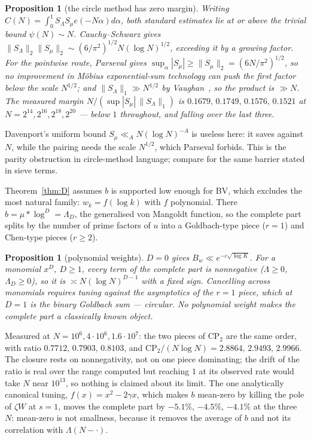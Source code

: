 \documentclass[11pt,a4paper]{article}
\theoremstyle{plain}
\newtheorem{proposition}[theorem]{Proposition}
\theoremstyle{definition}
\begin{document}
\begin{proposition}[the circle method has zero margin]\label{prop:E}
Writing $C(N)=\int_0^1 S_\Lambda S_\mu e(-N\alpha)d\alpha$, both
standard estimates lie at or above the trivial bound $\psi(N)\sim N$.
Cauchy--Schwarz gives
$\|S_\Lambda\|_2\|S_\mu\|_2 \sim (6/\pi^2)^{1/2}N(\log N)^{1/2}$,
exceeding it by a growing factor. For the pointwise route, Parseval
gives $\sup_\alpha|S_\mu| \ge \|S_\mu\|_2 = (6N/\pi^2)^{1/2}$, so no
improvement in M\"obius exponential-sum technology can push the first
factor below the scale $N^{1/2}$; and $\|S_\Lambda\|_1 \gg N^{1/2}$ by
Vaughan~\cite{Vau88}, so the product is $\gg N$.
The measured margin $N/(\sup|S_\mu|\,\|S_\Lambda\|_1)$ is
$0.1679,\,0.1749,\,0.1576,\,0.1521$ at
$N=2^{14},2^{16},2^{18},2^{20}$ --- below $1$ throughout, and falling
over the last three.
\end{proposition}

Davenport's uniform bound $S_\mu\ll_A N(\log N)^{-A}$ is useless here:
it saves against $N$, while the pairing needs the scale $N^{1/2}$,
which Parseval forbids. This is the parity obstruction in
circle-method language; compare \cite{MV17} for the same barrier stated
in sieve terms.

Theorem~\ref{thm:D} assumes $b$ is supported low enough for BV, which
excludes the most natural family: $w_k=f(\log k)$ with $f$ polynomial.
There $b=\mu*\log^D=\Lambda_D$, the generalised von Mangoldt function,
so the complete part splits by the number of prime factors of $u$ into
a Goldbach-type piece ($r=1$) and Chen-type pieces ($r\ge2$).

\begin{proposition}[polynomial weights]\label{prop:Dpp}
$D=0$ gives $B_w\ll e^{-c\sqrt{\log K}}$. For a monomial $x^D$,
$D\ge1$, every term of the complete part is nonnegative
($\Lambda\ge0$, $\Lambda_D\ge0$), so it is $\asymp N(\log N)^{D-1}$
with a fixed sign. Cancelling across monomials requires tuning against
the asymptotics of the $r=1$ piece, which at $D=1$ is the binary
Goldbach sum --- circular. No polynomial weight makes the complete
part a classically known object.
\end{proposition}

Measured at $N=10^6,4\cdot10^6,1.6\cdot10^7$: the two pieces of
$\mathrm{CP}_2$ are the same order, with ratio
$0.7712,\,0.7903,\,0.8103$, and
$\mathrm{CP}_2/(N\log N) = 2.8864,\,2.9493,\,2.9966$. The closure rests
on nonnegativity, not on one piece dominating; the drift of the ratio
is real over the range computed but reaching $1$ at its observed rate
would take $N$ near $10^{13}$, so nothing is claimed about its limit.
The one analytically canonical tuning, $f(x)=x^2-2\gamma x$, which
makes $b$ mean-zero by killing the pole of $\zeta W$ at $s=1$, moves
the complete part by $-5.1\%$, $-4.5\%$, $-4.1\%$ at the three $N$:
mean-zero is not smallness, because it removes the average of $b$ and
not its correlation with $\Lambda(N-\cdot)$.
\end{document}
